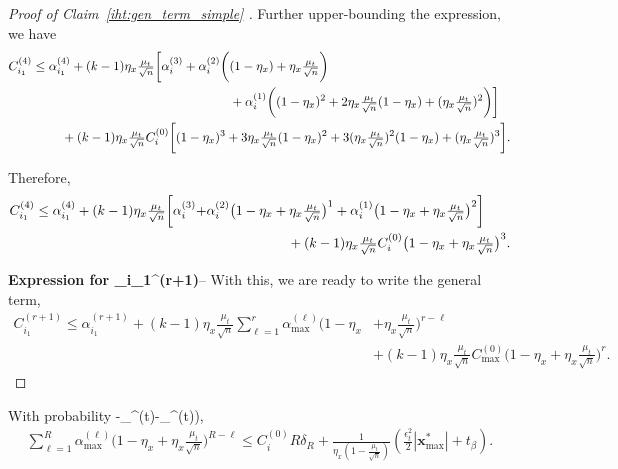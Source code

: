 \documentclass{article}
\newcommand{\HT}{{\c{T}}}
\def\[#1\]{{$#1$}}
\def\b#1{{\mathbf{#1}}}
\def\c#1{{\mathcal{#1}}}
\begin{document}
\begin{proof}[Proof of Claim~\ref{iht:gen_term_simple} ]
	
	Further upper-bounding the expression, we have
	\begin{align*}
	C_{i_1}^{(4)} 
	&\leq \alpha^{(4)}_{i_1} + (k-1)\eta_x\tfrac{\mu_t}{\sqrt{n}}\bigg[ \alpha^{(3)}_{i} + \alpha^{(2)}_{i}\bigg((1-\eta_x) + \eta_x\tfrac{\mu_t}{\sqrt{n}} \bigg) 
	\\&\hspace{5.5cm}+ \alpha^{(1)}_{i}\bigg(  (1-\eta_x)^{2} +2\eta_x\tfrac{\mu_t}{\sqrt{n}}(1-\eta_x) + (\eta_x\tfrac{\mu_t}{\sqrt{n}})^2 \bigg) \bigg] \notag \\
	&~~~~~~~+ (k-1)\eta_x\tfrac{\mu_t}{\sqrt{n}}C_{i}^{(0)}\bigg[ (1-\eta_x)^{3}
	+ 3\eta_x\tfrac{\mu_t}{\sqrt{n}}(1-\eta_x)^{2} 
	+3(\eta_x\tfrac{\mu_t}{\sqrt{n}})^2(1-\eta_x)
	+  (\eta_x\tfrac{\mu_t}{\sqrt{n}})^3 \bigg].
	\end{align*}
	
	Therefore, 
	\begin{align}\label{eq:C_i_4}
	C_{i_1}^{(4)} 
	\leq \alpha^{(4)}_{i_1} + (k-1)\eta_x\tfrac{\mu_t}{\sqrt{n}}\bigg[ \alpha^{(3)}_{i} + &\alpha^{(2)}_{i}\big(1-\eta_x + \eta_x\tfrac{\mu_t}{\sqrt{n}} \big)^1 
	+ \alpha^{(1)}_{i}\big(1-\eta_x + \eta_x\tfrac{\mu_t}{\sqrt{n}} \big)^2  \bigg] \notag\\
	&~~~~~~~~~~~~~~~~~~+ (k-1)\eta_x\tfrac{\mu_t}{\sqrt{n}}C_{i}^{(0)} \big(1-\eta_x + \eta_x\tfrac{\mu_t}{\sqrt{n}} \big)^3.
	\end{align}
	
	\noindent\textbf{Expression for \[C_{i_1}^{(r+1)}\]}-- With this, we are ready to write the general term, 
	\begin{align*}
	C_{i_1}^{(r+1)} 
	\leq \alpha^{(r+1)}_{i_1} + (k-1)\eta_x\tfrac{\mu_t}{\sqrt{n}} \textstyle\sum\limits_{\ell = 1}^{r}  \alpha^{(\ell)}_{\max}\big(1-\eta_x &+ \eta_x\tfrac{\mu_t}{\sqrt{n}} \big)^{r -\ell}
	\\&+ (k-1)\eta_x\tfrac{\mu_t}{\sqrt{n}}C_{\max}^{(0)} \big(1-\eta_x + \eta_x\tfrac{\mu_t}{\sqrt{n}} \big)^r. 
	
	
	\end{align*}
	
\end{proof}



\begin{claim}
	\label{iht:C_i1_inter_alpha_sum}
	\begin{em}
	With probability \[(1 -\delta_{\HT}^{(t)}-\delta_{\beta}^{(t)})\],
	\begin{align*}
	\textstyle\sum\limits_{\ell = 1}^{{R}}  \alpha^{(\ell)}_{\max}\big(1-\eta_x + \eta_x\tfrac{\mu_t}{\sqrt{n}} \big)^{{R} -\ell} \leq C_i^{(0)}{R}\delta_{R}  + \tfrac{1}{\eta_x( 1- \tfrac{\mu_t}{\sqrt{n}})}(\tfrac{\epsilon_t^2}{2} |\b{x}_{\max}^*| +t_\beta).
	\end{align*}
	\end{em}
\end{claim}
\end{document}
